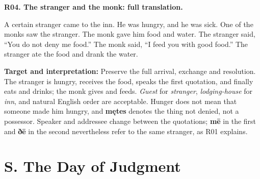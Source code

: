 \par\begin{minipage}{\linewidth}\raggedright
\textbf{R04. The stranger and the monk: full translation.}

A certain stranger came to the inn. He was hungry, and he was sick. One of the monks saw the stranger. The monk gave him food and water. The stranger said, “You do not deny me food.” The monk said, “I feed you with good food.” The stranger ate the food and drank the water.

\textbf{Target and interpretation:} Preserve the full arrival, exchange and resolution. The stranger is hungry, receives the food, speaks the first quotation, and finally eats and drinks; the monk gives and feeds. \emph{Guest} for \emph{stranger}, \emph{lodging-house} for \emph{inn}, and natural English order are acceptable. Hunger does not mean that someone made him hungry, and \textbf{mętes} denotes the thing not denied, not a possessor. Speaker and addressee change between the quotations; \textbf{mē} in the first and \textbf{ðē} in the second nevertheless refer to the same stranger, as R01 explains.

\end{minipage}\par\addvspace{4pt}

\clearpage
\section*{S. The Day of Judgment}

